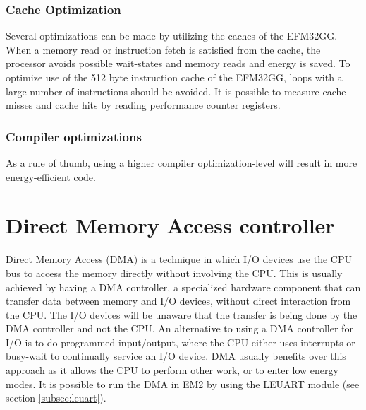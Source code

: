 \subsubsection{Cache Optimization}
Several optimizations can be made by utilizing the caches of the EFM32GG. When a memory read or instruction fetch is satisfied from the cache, the processor avoids possible wait-states and memory reads and energy is saved. To optimize use of the 512 byte instruction cache of the EFM32GG, loops with a large number of instructions should be avoided. It is possible to measure cache misses and cache hits by reading performance counter registers.\cite{efm32-energy-optimization}


\subsubsection{Compiler optimizations}
As a rule of thumb, using a higher compiler optimization-level will result in more energy-efficient code.


%


\section{Direct Memory Access controller}
Direct Memory Access (DMA) is a technique in which I/O devices use the CPU bus to access the memory directly without involving the CPU. 
This is usually achieved by having a DMA controller, a specialized hardware component that can transfer data between memory and I/O devices, without direct interaction from the CPU. The I/O devices will be unaware that the transfer is being done by the DMA controller and not the CPU. An alternative to using a DMA controller for I/O is to do programmed input/output, where the CPU either uses interrupts or busy-wait to continually service an I/O device. DMA usually benefits over this approach as it allows the CPU to perform other work, or to enter low energy modes.
It is possible to run the DMA in EM2 by using the LEUART module (see section \ref{subsec:leuart}).

